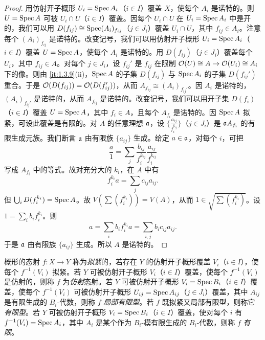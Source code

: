 \begin{proof}
用仿射开子概形 $U_i=\operatorname{Spec} A_i$（$i\in I$）覆盖 $X$，使每个 $A_i$ 是诺特的。则 $U=\operatorname{Spec} A$ 可被 $U_i\cap U$（$i\in I$）覆盖。因每个 $U_i\cap U$ 在 $U_i=\operatorname{Spec} A_i$ 中是开的，我们可以用 $D(f_{ij})\cong \operatorname{Spec} (A_i)_{f_{ij}}$（$j\in J_i$）覆盖 $U_i\cap U$，其中 $f_{ij}\in A_i$。注意每个 $(A_i)_{f_{ij}}$ 是诺特的。改变记号，我们可以用仿射开子概形 $U_i=\operatorname{Spec} A_i$（$i\in I$）覆盖 $U=\operatorname{Spec} A$，使每个 $A_i$ 是诺特的。用 $D(f_{ij})$（$j\in J_i$）覆盖每个 $U_i$，其中 $f_{ij}\in A$。对每个 $j\in J_i$，设 $f_{ij}'$ 是 $f_{ij}$ 在限制 $\mathcal{O}(U)\cong A\to \mathcal{O}(U_i)\cong A_i$ 下的像。则由 \ref{it:1.3.9}(ii)，$\operatorname{Spec} A$ 的子集 $D(f_{ij})$ 与 $\operatorname{Spec} A_i$ 的子集 $D(f_{ij}')$ 重合。于是 $\mathcal{O}(D(f_{ij}))=\mathcal{O}(D(f_{ij}'))$，从而 $A_{f_{ij}}\cong (A_i)_{f_{ij}'}$。因 $A_i$ 是诺特的，$(A_i)_{f_{ij}'}$ 是诺特的，从而 $A_{f_{ij}}$ 是诺特的。改变记号，我们可以用开子集 $D(f_i)$（$i\in I$）覆盖 $U=\operatorname{Spec} A$，其中 $f_i\in A$，且每个 $A_{f_i}$ 是诺特的。因 $\operatorname{Spec} A$ 拟紧，可设此覆盖是有限的。对 $A$ 的任意理想 $\mathfrak{a}$，设 $\{\frac{a_{ij}}{f_i^{k_{ij}}}\}$（$j\in J_i$）是 $\mathfrak{a} A_{f_i}$ 的有限生成元族。我们断言 $\mathfrak{a}$ 由有限族 $\{a_{ij}\}$ 生成。给定 $a\in \mathfrak{a}$，对每个 $i$，可把
\[
\frac{a}{1}=\sum_j \frac{b_{ij}}{f_i^{k_{ij}}}\frac{a_{ij}}{f_i^{k_{ij}}}
\]
写成 $A_{f_i}$ 中的等式。故对充分大的 $k_i$，在 $A$ 中有
\[
f_i^{k_i}a=\sum_j c_{ij}a_{ij}.
\]
但 $\bigcup_i D(f_i^{k_i})=\operatorname{Spec} A$。故 $V(\sum(f_i^{k_i}))=V(A)$，从而 $1\in \sqrt{\sum(f_i^{k_i})}$。设 $1=\sum_i b_if_i^{k_i}$。则
\[
a=\sum_i b_if_i^{k_i}a=\sum_{i,j} b_ic_{ij}a_{ij}.
\]
于是 $\mathfrak{a}$ 由有限族 $\{a_{ij}\}$ 生成。所以 $A$ 是诺特的。
\end{proof}

概形的态射 $f\colon X\to Y$ 称为\emph{拟紧}的，若存在 $Y$ 的仿射开子概形覆盖 $V_i$（$i\in I$），使每个 $f^{-1}(V_i)$ 拟紧。若 $Y$ 可被仿射开子概形 $V_i$（$i\in I$）覆盖，使每个 $f^{-1}(V_i)$ 是仿射的，则称 $f$ 为\emph{仿射}态射。若 $Y$ 可被仿射开子概形 $V_i=\operatorname{Spec} B_i$（$i\in I$）覆盖，使每个 $f^{-1}(V_i)$ 可被仿射开子概形 $U_{ij}=\operatorname{Spec} A_{ij}$（$j\in J_i$）覆盖，其中 $A_{ij}$ 是有限生成的 $B_i$-代数，则称 $f$ \emph{局部有限型}。若 $f$ 既拟紧又局部有限型，则称它\emph{有限型}。若 $Y$ 可被仿射开子概形 $V_i=\operatorname{Spec} B_i$（$i\in I$）覆盖，使对每个 $i$ 有 $f^{-1}(V_i)=\operatorname{Spec} A_i$，其中 $A_i$ 是某个作为 $B_i$-模有限生成的 $B_i$-代数，则称 $f$ \emph{有限}。

